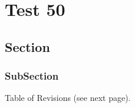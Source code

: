 \documentclass[12pt]{report}
\begin{document}
\chapter{Test 50}
\section{Section}
\subsection{SubSection}
Table of Revisions (see next page).
\tableofcontents
\tableofrevisions
{}
\end{document}
